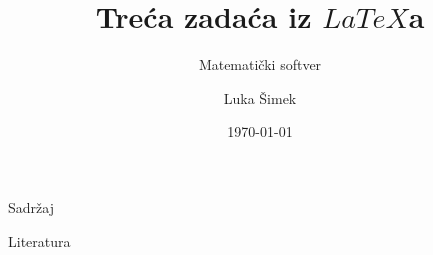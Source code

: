 \documentclass{beamer}
\title[Zadaća iz $LaTeX$a --- Beamer]{Treća zadaća iz $LaTeX$a}
\subtitle{Matematički softver}
\author{Luka Šimek}
\institute[PMF--MO]{Prirodoslovno-matematički fakultet --- Matematički odsjek\\Sveučilište u Zagrebu}
\date{\today}
\begin{document}
\begin{frame}[plain]
\titlepage
\end{frame}

\begin{frame}{Sadržaj}
\tableofcontents
\end{frame}


\begin{frame}[t]{Literatura}
\printbibliography
\end{frame}
\end{document}
